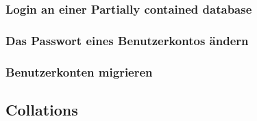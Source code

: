           \subsubsection{Login an einer Partially contained database}
          
          \subsubsection{Das Passwort eines Benutzerkontos ändern}

          \subsubsection{Benutzerkonten migrieren}
            \begin{literaturinternet}
              \item \cite{ff929139}
            \end{literaturinternet}
        \subsection{Collations}
